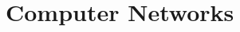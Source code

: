 \documentclass[\main/notes.tex]{subfiles}
\begin{document}
	\setcounter{chapter}{5}
	\chapter{Computer Networks}
	\vbox{}
\end{document}

